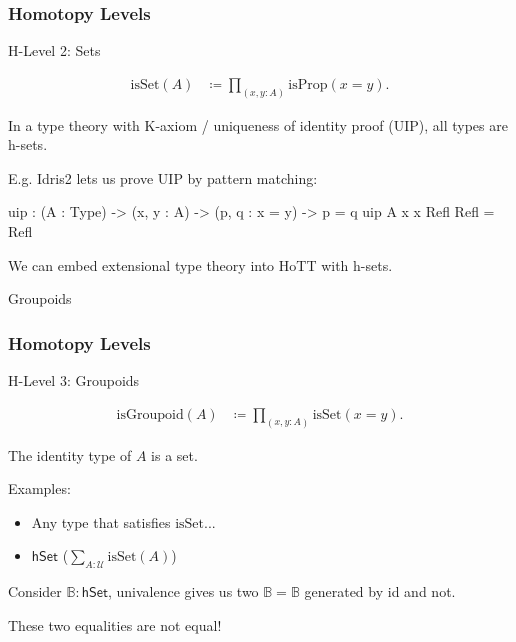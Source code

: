 \documentclass[9pt]{beamer}
\begin{document}
\begin{frame}[fragile]
\frametitle{Homotopy Levels}

H-Level 2: Sets

\begin{align*}
  \text{isSet}(A) & \coloneqq \prod_{(x,y:A)} \text{isProp}(x = y).
\end{align*}

In a type theory with \alert{K-axiom} / \alert{uniqueness of identity proof} (UIP), all types
are h-sets.

E.g. Idris2 lets us prove UIP by pattern matching:

    \begin{dblock}[UIP]
        \begin{code}
uip : (A : Type) -> (x, y : A) -> (p, q : x = y) -> p = q
uip A x x Refl Refl = Refl
        \end{code}
    \end{dblock}

We can embed extensional type theory into HoTT with h-sets.

\end{frame}


\begin{frame}{Groupoids}
\frametitle{Homotopy Levels}

H-Level 3: Groupoids

\begin{align*}
  \text{isGroupoid}(A) & \coloneqq \prod_{(x,y:A)} \text{isSet}(x = y).
\end{align*}

The identity type of $A$ is a set.

Examples:
\begin{itemize}
  \item Any type that satisfies $\text{isSet}$...
  \item $\mathsf{hSet}$ ($\sum_{A : \mathcal{U}} \text{isSet}(A)$)
\end{itemize}

Consider $\mathbb{B} : \mathsf{hSet}$, univalence gives us two $\mathbb{B} = \mathbb{B}$
generated by \alert{id} and \alert{not}.

These two equalities are not equal!

\end{frame}
\end{document}
